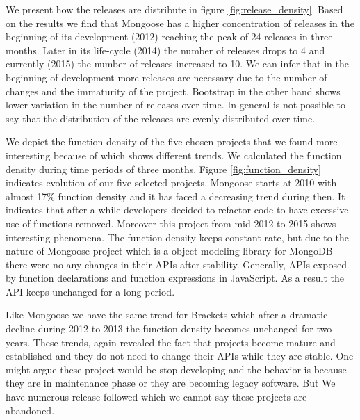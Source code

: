 We present how the releases are distribute in figure \ref{fig:release_density}. Based on the results we find that Mongoose has a higher concentration of releases in the beginning of its development (2012) reaching the peak of 24 releases in three months. Later in its life-cycle (2014) the number of releases drops to 4 and currently (2015) the number of releases increased to 10. We can infer that in the beginning of development more releases are necessary due to the number of changes and the immaturity of the project. Bootstrap in the other hand shows lower variation in the number of releases over time. In general is not possible to say that the distribution of the releases are evenly distributed over time. 

We depict the function density of the five chosen projects that we found more interesting because of which shows different trends. We calculated the function density during time periods of three months.
Figure \ref{fig:function_density} indicates evolution of our five selected projects. Mongoose starts at 2010 with almost 17\% function density and it has faced a decreasing trend during then. It indicates that after a while developers decided to refactor code to have  excessive use of functions removed. Moreover this project from mid 2012 to 2015 shows interesting phenomena. The function density keeps constant rate, but due to the nature of Mongoose project which is a object modeling library for MongoDB there were no any changes in their APIs after stability. Generally, APIs exposed by function declarations and function expressions in JavaScript. As a result the API keeps unchanged for a long period. 

\par
Like Mongoose we have the same trend for Brackets which after a dramatic decline during 2012 to 2013 the function density becomes unchanged for two years. These trends, again revealed the fact that projects become mature and established and they do not need to change their APIs while they are stable. One might argue these project would be stop developing and the behavior is because they are in maintenance phase or they are becoming legacy software. But We have numerous release followed which we cannot say these projects are abandoned.  

